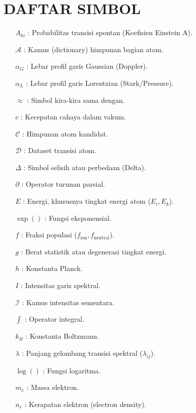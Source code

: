 
\chapter*{DAFTAR SIMBOL}

\begin{itemize}
    \item[$A_{ki}$] : Probabilitas transisi spontan (Koefisien Einstein A).
    \item[$\mathcal{A}$] : Kamus (dictionary) himpunan bagian atom.
    \item[$\alpha_G$] : Lebar profil garis Gaussian (Doppler).
    \item[$\alpha_L$] : Lebar profil garis Lorentzian (Stark/Pressure).
    \item[$\approx$] : Simbol kira-kira sama dengan.
    \item[$c$] : Kecepatan cahaya dalam vakum.
    \item[$\mathcal{C}$] : Himpunan atom kandidat.
    \item[$\mathcal{D}$] : Dataset transisi atom.
    \item[$\Delta$] : Simbol selisih atau perbedaan (Delta).
    \item[$\partial$] : Operator turunan parsial.
    \item[$E$] : Energi, khususnya tingkat energi atom ($E_i, E_k$).
    \item[$\exp()$] : Fungsi eksponensial.
    \item[$f$] : Fraksi populasi ($f_{\text{ion}}, f_{\text{neutral}}$).
    \item[$g$] : Berat statistik atau degenerasi tingkat energi.
    \item[$h$] : Konstanta Planck.
    \item[$I$] : Intensitas garis spektral.
    \item[$\mathcal{I}$] : Kamus intensitas sementara.
    \item[$\int$] : Operator integral.
    \item[$k_B$] : Konstanta Boltzmann.
    \item[$\lambda$] : Panjang gelombang transisi spektral ($\lambda_{ij}$).
    \item[$\log()$] : Fungsi logaritma.
    \item[$m_e$] : Massa elektron.
    \item[$n_e$] : Kerapatan elektron (electron density).

\end{itemize}
